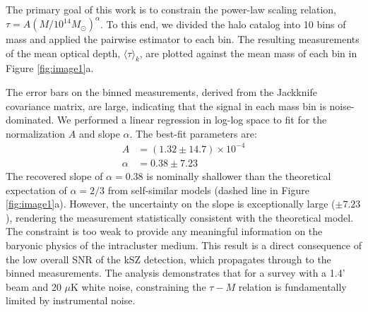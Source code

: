 \documentclass[]{article}
\begin{document}
The primary goal of this work is to constrain the power-law scaling relation, $\tau = A (M / 10^{14} M_\odot)^\alpha$. To this end, we divided the halo catalog into 10 bins of mass and applied the pairwise estimator to each bin. The resulting measurements of the mean optical depth, $\langle \tau \rangle_k$, are plotted against the mean mass of each bin in Figure \ref{fig:image1}a.

The error bars on the binned measurements, derived from the Jackknife covariance matrix, are large, indicating that the signal in each mass bin is noise-dominated. We performed a linear regression in log-log space to fit for the normalization $A$ and slope $\alpha$. The best-fit parameters are:
\begin{align}
    A &= (1.32 \pm 14.7) \times 10^{-4} \\
    \alpha &= 0.38 \pm 7.23
\end{align}
The recovered slope of $\alpha = 0.38$ is nominally shallower than the theoretical expectation of $\alpha = 2/3$ from self-similar models (dashed line in Figure \ref{fig:image1}a). However, the uncertainty on the slope is exceptionally large ($\pm 7.23$), rendering the measurement statistically consistent with the theoretical model. The constraint is too weak to provide any meaningful information on the baryonic physics of the intracluster medium. This result is a direct consequence of the low overall SNR of the kSZ detection, which propagates through to the binned measurements. The analysis demonstrates that for a survey with a 1.4' beam and 20 $\mu$K white noise, constraining the $\tau-M$ relation is fundamentally limited by instrumental noise.
\end{document}
